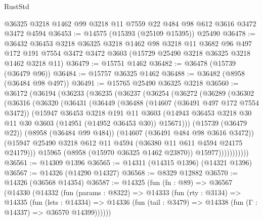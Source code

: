 \begin{lexlean}{RustStd}
\begin{coremodule}
    @36325
    @3218
    @1462
    @99
    @3218
    @11
    @7559
    @22
    @484
    @98
    @612
    @3616
    @3472
    @3472
    @4594
@36453 := @14575 (@15393 (@25109 @15395)) @25490
@36478 := @36432
    @36453
    @3218
    @36325
    @3218
    @1462
    @98
    @3218
    @11
    @3682
    @96
    @497
    @172
    @191
    @7554
    @3472
    @3472
    @3603
    (@15729 @25490 @3218 @36325 @3218 @1462 @3218 @11)
@36479 := @15751 @1462
@36482 := @36478 (@15739 (@36479 @96))
@36484 := @15757 @36325 @1462
@36488 := @36482 (@8958 (@36484 @98 @497))
@36491 := @15765 @25490 @36325 @3218
@36560 := @36172
    (@36194
      (@36233
        (@36235
          (@36237
            (@36254
              (@36272
                (@36289
                  (@36302
                    (@36316
                      (@36320
                        (@36431
                          (@36449
                            (@36488
                              (@14607 (@36491 @497 @172 @7554 @3472))
                              (@15947
                                @36453
                                @3218
                                @191
                                @11
                                @3603
                                (@14943
                                  @36453
                                  @3218
                                  @30
                                  @11
                                  @30
                                  @3603
                                  (@14951 (@14952 @36453 @30))
                                  @15671)))
                            (@15739 (@36479 @22))
                            (@8958 (@36484 @99 @484))
                            (@14607 (@36491 @484 @98 @3616 @3472))
                            (@15947
                              @25490
                              @3218
                              @612
                              @11
                              @4594
                              (@36380 @11 @611 @4594 @24175 @24179)))
                          @15965
                          (@8958 (@15970 @36325 @1462 @23870))
                          @15977)))))))))))
@36561 := @14309 @1396
@36565 := @14311 (@14315 @1396) (@14321 @1396)
@36567 := @14326 (@14290 @14327)
@36568 := @8329 @12882
@36570 := @14326 (@36568 @14354)
@36587 := @14325
    (fun (fn : @89) =>
    @36567
      (@14330
        (@14332
          (fun (params : @8322) =>
          @14333
            (fun (rty : @3134) =>
            @14335
              (fun (lets : @14334) =>
              @14336 (fun (tail : @3479) => @14338 (fun (Γ : @14337) => @36570 @14399))))))

\end{coremodule}
\end{lexlean}
